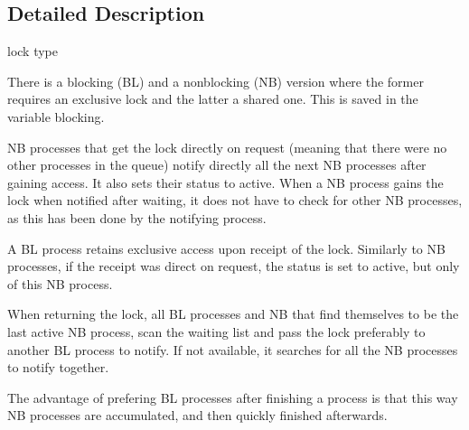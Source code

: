 \subsection{Detailed Description}
lock type 

There is a blocking (BL) and a nonblocking (NB) version where the former requires an exclusive lock and the latter a shared one. This is saved in the variable {\ttfamily blocking}.

NB processes that get the lock directly on request (meaning that there were no other processes in the queue) notify directly all the next NB processes after gaining access. It also sets their status to active. When a NB process gains the lock when notified after waiting, it does not have to check for other NB processes, as this has been done by the notifying process.

A BL process retains exclusive access upon receipt of the lock. Similarly to NB processes, if the receipt was direct on request, the status is set to active, but only of this NB process.

When returning the lock, all BL processes and NB that find themselves to be the last active NB process, scan the waiting list and pass the lock preferably to another BL process to notify. If not available, it searches for all the NB processes to notify together.

The advantage of prefering BL processes after finishing a process is that this way NB processes are accumulated, and then quickly finished afterwards.

